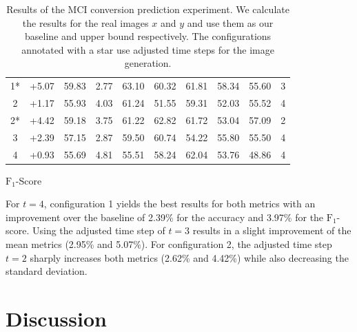 \begin{table}[h]
\begin{center}
\begin{tabular}{c c c c c c c c c c}
			1*              & +5.07  & 59.83 & 2.77 & 63.10 & 60.32 & 61.81 & 58.34 & 55.60 & 3 \\
			2\hphantom{*}   & +1.17  & 55.93 & 4.03 & 61.24 & 51.55 & 59.31 & 52.03 & 55.52 & 4 \\
			2*              & +4.42  & 59.18 & 3.75 & 61.22 & 62.82 & 61.72 & 53.04 & 57.09 & 2 \\
			3\hphantom{*}   & +2.39  & 57.15 & 2.87 & 59.50 & 60.74 & 54.22 & 55.80 & 55.50 & 4 \\
			4\hphantom{*}   & +0.93  & 55.69 & 4.81 & 55.51 & 58.24 & 62.04 & 53.76 & 48.86 & 4 \\
			\bottomrule
		\end{tabular}
		\caption*{$\text{F}_1$-Score}
	\end{center}
	\caption{Results of the MCI conversion prediction experiment. We calculate the results for the real images $x$ and $y$ and use them as our baseline and upper bound respectively. The configurations annotated with a star use adjusted time steps for the image generation.}
	\label{tab:expconv}
\end{table}

For $t = 4$, configuration 1 yields the best results for both metrics with an improvement over the baseline of 2.39\% for the accuracy and 3.97\% for the $\text{F}_1$-score. Using the adjusted time step of $t = 3$ results in a slight improvement of the mean metrics (2.95\% and 5.07\%). For configuration 2, the adjusted time step $t = 2$ sharply increases both metrics (2.62\% and 4.42\%) while also decreasing the standard deviation.

\chapter{Discussion}

